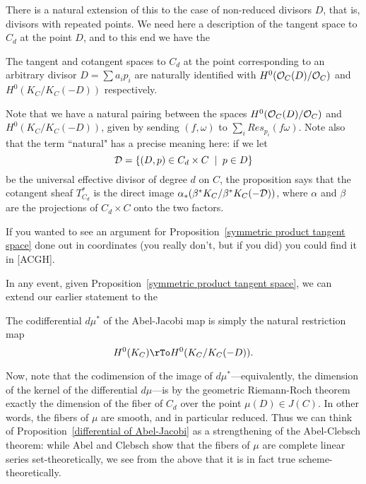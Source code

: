 There is a natural extension of this to the case of non-reduced divisors $D$, that is, divisors with repeated points. We need here a description of the tangent space to $C_d$ at the point $D$, and to this end we have the

\begin{proposition}\label{symmetric product tangent space}
The tangent and cotangent spaces to $C_d$ at the point corresponding to an arbitrary divisor $D = \sum a_ip_i$ are naturally identified with $H^0(\cO_C(D)/\cO_C)$ and $H^0(K_C/K_C(-D))$ respectively.
\end{proposition}

Note that we have a natural pairing between the spaces $H^0(\cO_C(D)/\cO_C)$ and $H^0(K_C/K_C(-D))$, given by sending $(f, \omega)$ to $\sum_i Res_{p_i}(f\omega)$. Note also that the term ``natural" has a precise meaning here: if we let 
$$
\cD = \{ (D, p) \in C_d \times C \; \mid \; p \in D \}
$$
be the universal effective divisor of degree $d$ on $C$, the proposition says that the cotangent sheaf $T^*_{C_d}$ is the direct image $\alpha_*(\beta^*K_C/\beta^*K_C(-\cD))$, where $\alpha$ and $\beta$ are the projections of $C_d \times C$ onto the two factors.

If you wanted to see an argument for Proposition~\ref{symmetric product tangent space} done out in coordinates (you really don't, but if you did) you could find it in [ACGH].

In any event, given Proposition~\ref{symmetric product tangent space}, we can extend our earlier statement to the

\begin{proposition}\label{differential of Abel-Jacobi}
The codifferential $d\mu^*$ of the Abel-Jacobi map is simply the natural restriction map
$$
H^0(K_C) \rTo H^0(K_C/K_C(-D)).
$$
\end{proposition}

Now, note that the codimension of the image of $d\mu^*$---equivalently, the dimension of the kernel of the differential $d\mu$---is by the geometric Riemann-Roch theorem exactly the dimension of the fiber of $C_d$ over the point $\mu(D) \in J(C)$. In other words, the fibers of $\mu$ are smooth, and in particular reduced. Thus we can think of Proposition~\ref{differential of Abel-Jacobi} as a strengthening of the Abel-Clebsch theorem: while Abel and Clebsch show that the fibers of $\mu$ are complete linear series set-theoretically, we see from the above that it is in fact true scheme-theoretically.

